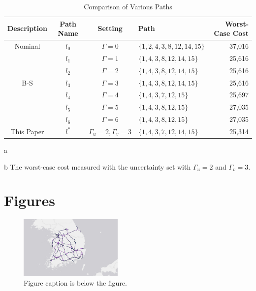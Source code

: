 \documentclass[letterpaper, 11pt]{article}
\begin{document}
\begin{table} \centering
\begin{threeparttable}
\caption{Comparison of Various Paths}
\label{table:threeparttable}
    \begin{tabular}{ccclr}
    \toprule
    Description & Path Name & Setting & Path & Worst-Case Cost \tnote{b} \\
    \midrule
    Nominal
         & $l_0$ & $\Gamma=0$ & $\{1,2,4,3,8,12,14,15\}$ & 37,016 \\
    \midrule
         & $l_1$ & $\Gamma=1$ & $\{1,4,3,8,12,14,15\}$ & 25,616 \\
         & $l_2$ & $\Gamma=2$ & $\{1,4,3,8,12,14,15\}$ & 25,616 \\
    B-S\tnote{a}
         & $l_3$ & $\Gamma=3$ & $\{1,4,3,8,12,14,15\}$ & 25,616 \\
         & $l_4$ & $\Gamma=4$ & $\{1,4,3,7,12,15\}$ & 25,697 \\
         & $l_5$ & $\Gamma=5$ & $\{1,4,3,8,12,15\}$ & 27,035 \\
         & $l_6$ & $\Gamma=6$ & $\{1,4,3,8,12,15\}$ & 27,035 \\
    \midrule
    This Paper
         & $l^*$ & $\Gamma_u=2, \Gamma_v=3$ & $\{1,4,3,7,12,14,15\}$ & 25,314 \\
    \bottomrule
    \end{tabular}
    \begin{tablenotes}
        \item [a] \citet{Bertsimas2003network}
        \item [b] The worst-case cost measured with the uncertainty set with $\Gamma_u=2$ and $\Gamma_v=3$.
    \end{tablenotes}
\end{threeparttable}
\end{table}














\section{Figures} \label{sec:figures}


\begin{figure} \centering
\includegraphics[width=0.45\textwidth]{map}
\caption{Figure caption is below the figure.}
\label{fig:map}
\end{figure}
\end{document}
